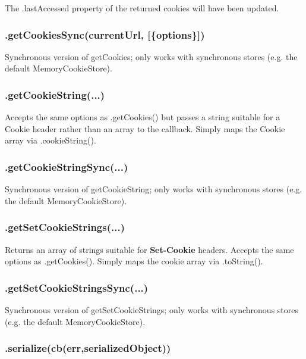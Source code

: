 The {\ttfamily .last\+Accessed} property of the returned cookies will have been updated.

\subsubsection*{{\ttfamily .get\+Cookies\+Sync(current\+Url, \mbox{[}\{options\}\mbox{]})}}

Synchronous version of {\ttfamily get\+Cookies}; only works with synchronous stores (e.\+g. the default {\ttfamily Memory\+Cookie\+Store}).

\subsubsection*{{\ttfamily .get\+Cookie\+String(...)}}

Accepts the same options as {\ttfamily .get\+Cookies()} but passes a string suitable for a Cookie header rather than an array to the callback. Simply maps the {\ttfamily Cookie} array via {\ttfamily .cookie\+String()}.

\subsubsection*{{\ttfamily .get\+Cookie\+String\+Sync(...)}}

Synchronous version of {\ttfamily get\+Cookie\+String}; only works with synchronous stores (e.\+g. the default {\ttfamily Memory\+Cookie\+Store}).

\subsubsection*{{\ttfamily .get\+Set\+Cookie\+Strings(...)}}

Returns an array of strings suitable for {\bfseries Set-\/\+Cookie} headers. Accepts the same options as {\ttfamily .get\+Cookies()}. Simply maps the cookie array via {\ttfamily .to\+String()}.

\subsubsection*{{\ttfamily .get\+Set\+Cookie\+Strings\+Sync(...)}}

Synchronous version of {\ttfamily get\+Set\+Cookie\+Strings}; only works with synchronous stores (e.\+g. the default {\ttfamily Memory\+Cookie\+Store}).

\subsubsection*{{\ttfamily .serialize(cb(err,serialized\+Object))}}

